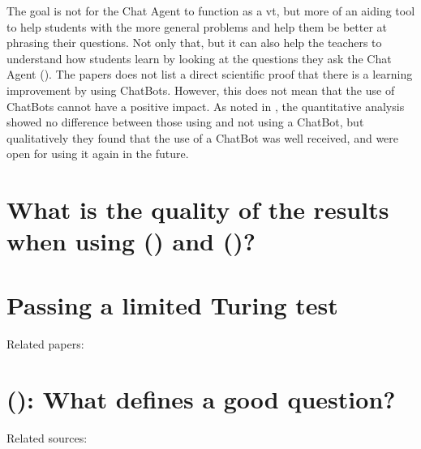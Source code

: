 \vspace{0.5em}\newline
The goal is not for the Chat Agent to function as a \gls{vt}, but more of an aiding tool to help students with the more general problems and help them be better at phrasing 
their questions. Not only that, but it can also help the teachers to understand how students learn by looking at the questions they ask the Chat Agent (\citet{Knill2004,Rossi2011}). 
The papers does not list a direct scientific proof that there is a learning improvement by using ChatBots. However, this does not mean that the use of ChatBots cannot have a 
positive impact. As noted in \citet{Kowalski2013}, the quantitative analysis showed no difference between those using and not using a ChatBot, but qualitatively they found that 
the use of a ChatBot was well received, and were open for using it again in the future.


\section{What is the quality of the results when using  () and  ()?}
\label{chapter3:quality_results_hmm_bn}


\section{Passing a limited Turing test}
\label{chapter3:turing_test}

Related papers: \cite{Harnad2000,Livingstone2006,Turing1998}

\section{ (): What defines a good question?}
\label{chapter3:define_good_question}

Related sources: \cite{Stackoverflow.com2015,CommunityWiki2015,Lezina2013,Stackoverflow.com2015a,Stackoverflow.com2015b,Stackoverflow.com2015c,Treude2011}






